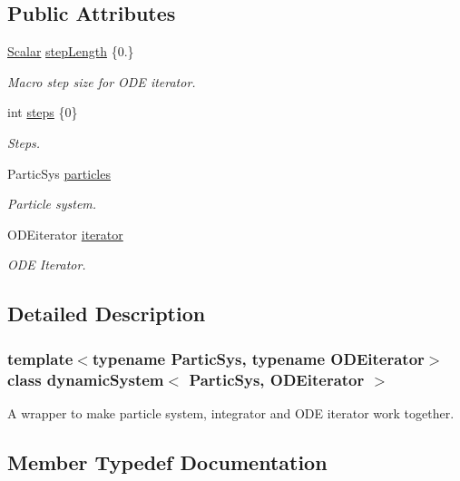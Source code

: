 \subsection*{Public Attributes}
\begin{DoxyCompactItemize}
\item 
\mbox{\hyperlink{classdynamic_system_a6eb7b06a4ee5721a1ee0855a854c3431}{Scalar}} \mbox{\hyperlink{classdynamic_system_a3f0e5b7ef17b728c723c67aefa9dbada}{step\+Length}} \{0.\}
\begin{DoxyCompactList}\small\item\em Macro step size for O\+DE iterator. \end{DoxyCompactList}\item 
int \mbox{\hyperlink{classdynamic_system_ae9821e179896e6cddbbcc4e706552c57}{steps}} \{0\}
\begin{DoxyCompactList}\small\item\em Steps. \end{DoxyCompactList}\item 
Partic\+Sys \mbox{\hyperlink{classdynamic_system_a809657c0ef63741a7e3d6f32bc87bfe3}{particles}}
\begin{DoxyCompactList}\small\item\em Particle system. \end{DoxyCompactList}\item 
O\+D\+Eiterator \mbox{\hyperlink{classdynamic_system_a0a13a11664ce5761ab4296b1b0421f99}{iterator}}
\begin{DoxyCompactList}\small\item\em O\+DE Iterator. \end{DoxyCompactList}\end{DoxyCompactItemize}


\subsection{Detailed Description}
\subsubsection*{template$<$typename Partic\+Sys, typename O\+D\+Eiterator$>$\newline
class dynamic\+System$<$ Partic\+Sys, O\+D\+Eiterator $>$}

A wrapper to make particle system, integrator and O\+DE iterator work together. 

\subsection{Member Typedef Documentation}
\mbox{\label{classdynamic_system_a6eb7b06a4ee5721a1ee0855a854c3431}} 

